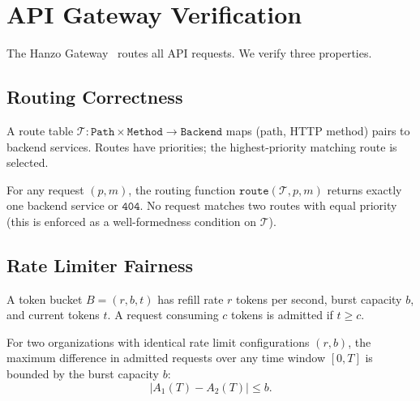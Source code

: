\section{API Gateway Verification}

\label{sec:gateway}

The Hanzo Gateway~\cite{hanzogateway} routes all API requests. We verify three
properties.

\subsection{Routing Correctness}

\begin{definition}
A route table $\mathcal{T}: \texttt{Path} \times \texttt{Method} \to
\texttt{Backend}$ maps (path, HTTP method) pairs to backend services.
Routes have priorities; the highest-priority matching route is selected.
\end{definition}

\begin{theorem}
For any request $(p, m)$, the routing function $\texttt{route}(\mathcal{T},
p, m)$ returns exactly one backend service or $\texttt{404}$. No request
matches two routes with equal priority (this is enforced as a well-formedness
condition on $\mathcal{T}$).
\end{theorem}

\subsection{Rate Limiter Fairness}

\begin{definition}
A token bucket $B = (r, b, t)$ has refill rate $r$ tokens per second, burst
capacity $b$, and current tokens $t$. A request consuming $c$ tokens is
admitted if $t \geq c$.
\end{definition}

\begin{theorem}
For two organizations with identical rate limit configurations $(r, b)$, the
maximum difference in admitted requests over any time window $[0, T]$ is
bounded by the burst capacity $b$:
\begin{equation}
|A_1(T) - A_2(T)| \leq b.
\end{equation}
\end{theorem}

